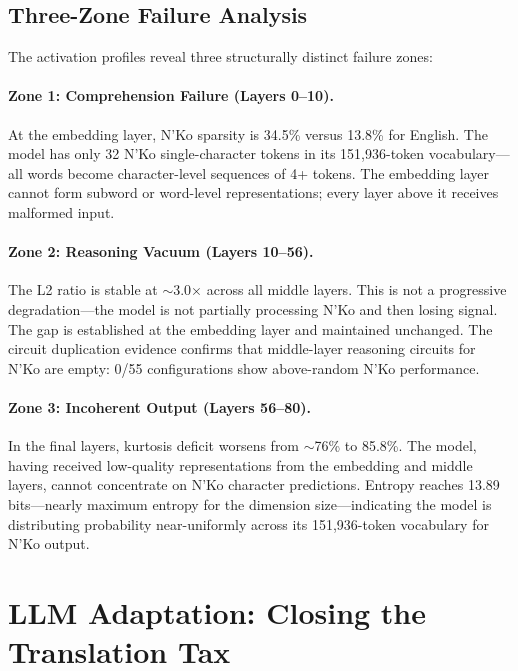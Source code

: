 \documentclass[11pt]{article}
\begin{document}
\subsection{Three-Zone Failure Analysis}

The activation profiles reveal three structurally distinct failure zones:

\paragraph{Zone 1: Comprehension Failure (Layers 0--10).}
At the embedding layer, N'Ko sparsity is 34.5\% versus 13.8\% for English.
The model has only 32 N'Ko single-character tokens in its 151,936-token vocabulary---all words become character-level sequences of 4+ tokens.
The embedding layer cannot form subword or word-level representations; every layer above it receives malformed input.

\paragraph{Zone 2: Reasoning Vacuum (Layers 10--56).}
The L2 ratio is stable at ${\sim}$3.0$\times$ across all middle layers.
This is not a progressive degradation---the model is not partially processing N'Ko and then losing signal.
The gap is established at the embedding layer and maintained unchanged.
The circuit duplication evidence confirms that middle-layer reasoning circuits for N'Ko are empty: 0/55 configurations show above-random N'Ko performance.

\paragraph{Zone 3: Incoherent Output (Layers 56--80).}
In the final layers, kurtosis deficit worsens from ${\sim}$76\% to 85.8\%.
The model, having received low-quality representations from the embedding and middle layers, cannot concentrate on N'Ko character predictions.
Entropy reaches 13.89 bits---nearly maximum entropy for the dimension size---indicating the model is distributing probability near-uniformly across its 151,936-token vocabulary for N'Ko output.

\section{LLM Adaptation: Closing the Translation Tax}
\end{document}
